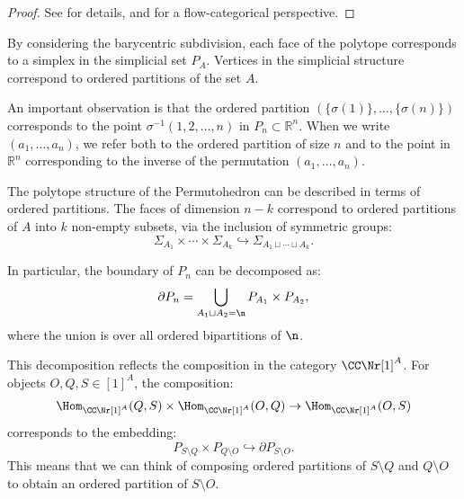 \begin{proof}
See \cite{Leitch74} for details, and \cite[Remark~4.9]{LLS20} for a flow-categorical perspective.
\end{proof}

By considering the barycentric subdivision, each face of the polytope corresponds to a simplex in the simplicial set $P_A$. Vertices in the simplicial structure correspond to ordered partitions of the set $A$.

\begin{rem}
An important observation is that the ordered partition $(\{ \sigma(1) \}, \dots, \{ \sigma(n) \})$ corresponds to the point $\sigma^{-1}(1, 2, \dots, n)$ in $P_n \subset \mathbb{R}^n$. When we write $(a_1, \dots, a_n)$, we refer both to the ordered partition of size $n$ and to the point in $\mathbb{R}^n$ corresponding to the inverse of the permutation $(a_1, \dots, a_n)$.
\end{rem}

The polytope structure of the Permutohedron can be described in terms of ordered partitions. The faces of dimension $n - k$ correspond to ordered partitions of $A$ into $k$ non-empty subsets, via the inclusion of symmetric groups:
\begin{equation*}
    \Sigma_{A_1} \times \dotsb \times \Sigma_{A_k} \hookrightarrow \Sigma_{A_1 \sqcup \dotsb \sqcup A_k}.
\end{equation*}

In particular, the boundary of $P_n$ can be decomposed as:
\begin{equation*}
    \partial P_n = \bigcup_{A_1 \sqcup A_2 = \n} P_{A_1} \times P_{A_2},
\end{equation*}
where the union is over all ordered bipartitions of $\n$.

This decomposition reflects the composition in the category $\CC \Nr [1]^A$. For objects $O, Q, S \in [1]^A$, the composition:
\begin{equation*}
    \Hom_{\CC \Nr [1]^A}(Q, S) \times \Hom_{\CC \Nr [1]^A}(O, Q) \to \Hom_{\CC \Nr [1]^A}(O, S)
\end{equation*}
corresponds to the embedding:
\begin{equation*}
    P_{S \setminus Q} \times P_{Q \setminus O} \hookrightarrow \partial P_{S \setminus O}.
\end{equation*}
This means that we can think of composing ordered partitions of $S \setminus Q$ and $Q \setminus O$ to obtain an ordered partition of $S \setminus O$.

